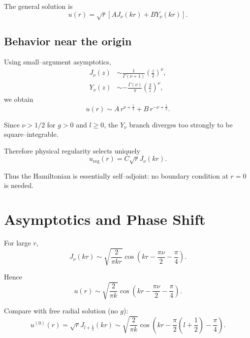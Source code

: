 \documentclass[11pt,a4paper]{article}
\begin{document}
The general solution is
\begin{equation}
u(r)
=
\sqrt{r}
\left[
A J_\nu(kr)
+
B Y_\nu(kr)
\right].
\end{equation}

\subsection*{Behavior near the origin}

Using small–argument asymptotics,
\begin{align}
J_\nu(z) &\sim \frac{1}{\Gamma(\nu+1)}\left(\frac{z}{2}\right)^\nu,\\
Y_\nu(z) &\sim -\frac{\Gamma(\nu)}{\pi}\left(\frac{2}{z}\right)^\nu,
\end{align}
we obtain
\begin{equation}
u(r)\sim
A\, r^{\nu+\frac{1}{2}}
+
B\, r^{-\nu+\frac{1}{2}}.
\end{equation}

Since $\nu>1/2$ for $g>0$ and $l\ge0$,
the $Y_\nu$ branch diverges too strongly to be square–integrable.

Therefore physical regularity selects uniquely
\begin{equation}
u_{\text{reg}}(r)
=
C\sqrt{r}J_\nu(kr).
\end{equation}

Thus the Hamiltonian is essentially self–adjoint:
no boundary condition at $r=0$ is needed.

\section{Asymptotics and Phase Shift}

For large $r$,
\begin{equation}
J_\nu(kr)
\sim
\sqrt{\frac{2}{\pi kr}}
\cos\left(kr-\frac{\pi\nu}{2}-\frac{\pi}{4}\right).
\end{equation}

Hence
\begin{equation}
u(r)
\sim
\sqrt{\frac{2}{\pi k}}
\cos\left(kr-\frac{\pi\nu}{2}-\frac{\pi}{4}\right).
\end{equation}

Compare with free radial solution (no $g$):
\begin{equation}
u^{(0)}(r)
=
\sqrt{r}J_{l+\frac{1}{2}}(kr)
\sim
\sqrt{\frac{2}{\pi k}}
\cos\left(
kr-\frac{\pi}{2}\left(l+\frac{1}{2}\right)-\frac{\pi}{4}
\right).
\end{equation}
\end{document}

